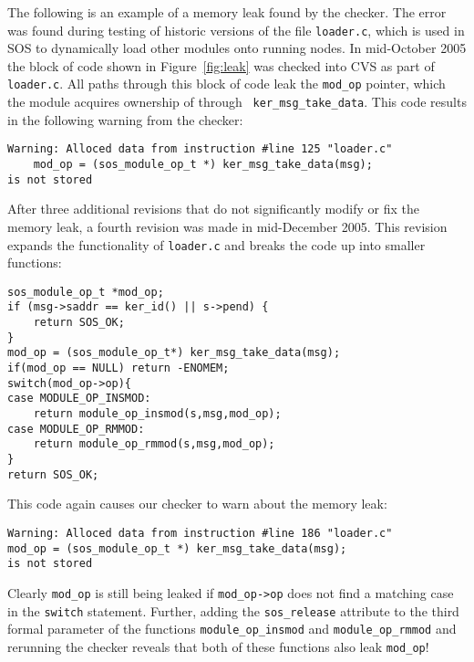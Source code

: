 The following is an example of a memory leak found by the checker.
The error was found during testing of historic versions of the file
{\tt loader.c}, which is used in SOS to dynamically load other modules
onto running nodes.  In mid-October 2005 the block of code shown in
Figure~\ref{fig:leak} was checked into CVS as part of {\tt loader.c}.
All paths through this block of code leak the {\tt mod\_op} pointer,
which the module acquires ownership of through {\tt
ker\_msg\_take\_data}.  This code results in the following warning
from the checker:

\begin{footnotesize}
\begin{verbatim}
Warning: Alloced data from instruction #line 125 "loader.c"
    mod_op = (sos_module_op_t *) ker_msg_take_data(msg);
is not stored
\end{verbatim}
\end{footnotesize}

After three additional revisions that do not significantly modify or
fix the memory leak, a fourth revision was made in mid-December 2005.
This revision expands the functionality of {\tt loader.c} and breaks
the code up into smaller functions:

\begin{footnotesize}
\begin{verbatim}
sos_module_op_t *mod_op;
if (msg->saddr == ker_id() || s->pend) {
    return SOS_OK;
}
mod_op = (sos_module_op_t*) ker_msg_take_data(msg);
if(mod_op == NULL) return -ENOMEM;
switch(mod_op->op){
case MODULE_OP_INSMOD:
    return module_op_insmod(s,msg,mod_op);
case MODULE_OP_RMMOD:
    return module_op_rmmod(s,msg,mod_op);
}
return SOS_OK;
\end{verbatim}
\end{footnotesize}

This code again causes our checker to warn about the memory leak:

\begin{footnotesize}
\begin{verbatim}
Warning: Alloced data from instruction #line 186 "loader.c"
mod_op = (sos_module_op_t *) ker_msg_take_data(msg);
is not stored
\end{verbatim}
\end{footnotesize}

Clearly {\tt mod\_op} is still being leaked if {\tt mod\_op->op} does
not find a matching case in the {\tt switch} statement.  Further,
adding the {\tt sos\_release} attribute to the third formal parameter
of the functions {\tt module\_op\_insmod} and {\tt module\_op\_rmmod}
and rerunning the checker reveals that both of these functions also
leak {\tt mod\_op}!

